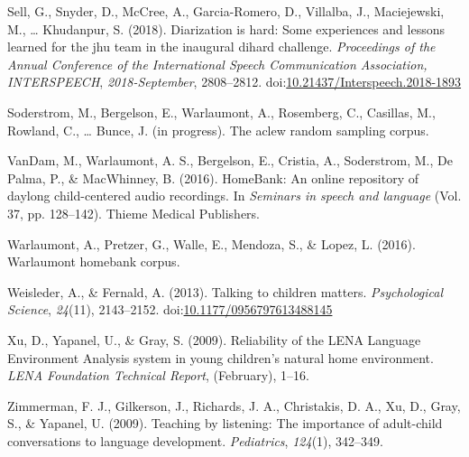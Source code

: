 \documentclass[english,floatsintext,man]{apa6}
\begin{document}
\hypertarget{ref-sell2018}{}
Sell, G., Snyder, D., McCree, A., Garcia-Romero, D., Villalba, J.,
Maciejewski, M., \ldots{} Khudanpur, S. (2018). Diarization is hard:
Some experiences and lessons learned for the jhu team in the inaugural
dihard challenge. \emph{Proceedings of the Annual Conference of the
International Speech Communication Association, INTERSPEECH},
\emph{2018-September}, 2808--2812.
doi:\href{https://doi.org/10.21437/Interspeech.2018-1893}{10.21437/Interspeech.2018-1893}

\hypertarget{ref-soderstrom}{}
Soderstrom, M., Bergelson, E., Warlaumont, A., Rosemberg, C., Casillas,
M., Rowland, C., \ldots{} Bunce, J. (in progress). The aclew random
sampling corpus.

\hypertarget{ref-vandam2016homebank}{}
VanDam, M., Warlaumont, A. S., Bergelson, E., Cristia, A., Soderstrom,
M., De Palma, P., \& MacWhinney, B. (2016). HomeBank: An online
repository of daylong child-centered audio recordings. In \emph{Seminars
in speech and language} (Vol. 37, pp. 128--142). Thieme Medical
Publishers.

\hypertarget{ref-warlaumont2016warlaumont}{}
Warlaumont, A., Pretzer, G., Walle, E., Mendoza, S., \& Lopez, L.
(2016). Warlaumont homebank corpus.

\hypertarget{ref-Weisleder2013a}{}
Weisleder, A., \& Fernald, A. (2013). Talking to children matters.
\emph{Psychological Science}, \emph{24}(11), 2143--2152.
doi:\href{https://doi.org/10.1177/0956797613488145}{10.1177/0956797613488145}

\hypertarget{ref-Xu2009}{}
Xu, D., Yapanel, U., \& Gray, S. (2009). Reliability of the LENA
Language Environment Analysis system in young children's natural home
environment. \emph{LENA Foundation Technical Report}, (February), 1--16.

\hypertarget{ref-zimmerman2009}{}
Zimmerman, F. J., Gilkerson, J., Richards, J. A., Christakis, D. A., Xu,
D., Gray, S., \& Yapanel, U. (2009). Teaching by listening: The
importance of adult-child conversations to language development.
\emph{Pediatrics}, \emph{124}(1), 342--349.
\end{document}
